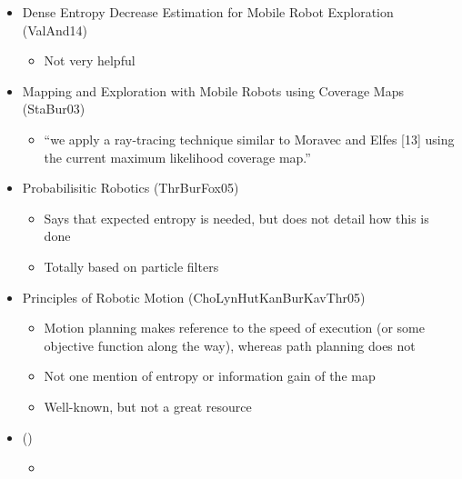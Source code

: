 \documentclass[10pt]{article}
\theoremstyle{plain}\theorembodyfont{\normalfont}
\begin{document}
\begin{itemize}
	\item Dense Entropy Decrease Estimation for Mobile Robot Exploration (ValAnd14)
	\begin{itemize}
		\item Not very helpful
	\end{itemize}	
	\item Mapping and Exploration with Mobile Robots using Coverage Maps (StaBur03)
	\begin{itemize}
		\item ``we apply a ray-tracing technique similar to Moravec and Elfes [13] using the current maximum likelihood coverage map.''
	\end{itemize}
	\item  Probabilisitic Robotics (ThrBurFox05)
	\begin{itemize}
		\item Says that expected entropy is needed, but does not detail how this is done
		\item Totally based on particle filters
	\end{itemize}
	\item Principles of Robotic Motion (ChoLynHutKanBurKavThr05)
	\begin{itemize}
		\item Motion planning makes reference to the speed of execution (or some objective function along the way), whereas path planning does not
		\item Not one mention of entropy or information gain of the map
		\item Well-known, but not a great resource
	\end{itemize}	
	\item  ()
	\begin{itemize}
		\item 
	\end{itemize}
\end{itemize}
\end{document}
